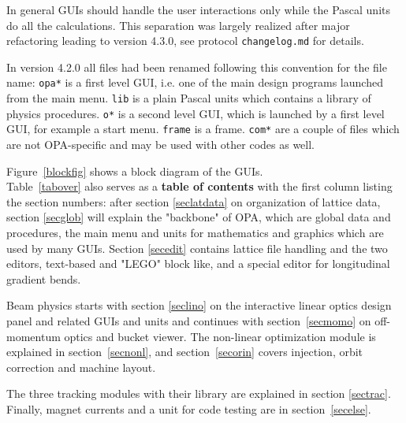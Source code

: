 \documentclass[12pt]{article}
\newcommand\code[1]{{\tt #1}}
\begin{document}
In general GUIs should handle the user interactions only while the Pascal units do all the calculations. This separation was largely realized after major refactoring leading to version 4.3.0, see protocol \code{changelog.md} for details.

In version 4.2.0 all files had been renamed following this convention for the file name: 
\code{opa*} is a first level GUI, i.e. one of the main design programs launched from the main menu. \code{*lib} is a plain Pascal units which contains a library of physics procedures. 
\code{o*} is a second level GUI, which is launched by a first level GUI, for example a start menu. \code{*frame} is a frame. \code{com*} are a couple of files which are not OPA-specific and may be used with other codes as well. 

Figure~\ref{blockfig} shows a block diagram of the GUIs. \\

Table~\ref{tabover} also serves as a {\bf table of contents} with the first column listing the section numbers:
after section \ref{seclatdata} on organization of lattice data, 
section \ref{secglob} will explain the "backbone" of OPA, which are global data and procedures, the main menu and units for mathematics and graphics which are used by many GUIs. 
Section \ref{secedit} contains lattice file handling and the two editors, text-based and "LEGO" block like, and a special editor for longitudinal gradient bends.

Beam physics starts with section \ref{seclino} on the interactive linear optics design panel and related GUIs and units and continues with section~\ref{secmomo} on off-momentum optics and bucket viewer. The non-linear optimization module is explained in section~\ref{secnonl}, and section~\ref{secorin} covers injection, orbit correction and machine layout.

The three tracking modules with their library are explained in section \ref{sectrac}. Finally, magnet currents and a unit for code testing are in section~\ref{secelse}.
\end{document}
